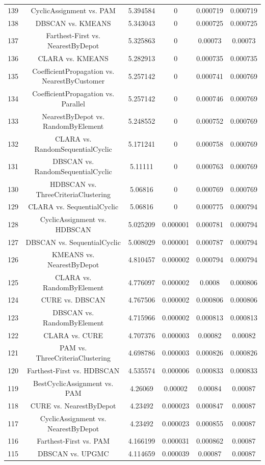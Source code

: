 \documentclass[a4paper,10pt]{article}
\begin{document}
\begin{landscape}
\begin{table}[!htp]
\begin{tabular}{cccccc}
139&CyclicAssignment vs. PAM&5.394584&0&0.000719&0.000719\\
138&DBSCAN vs. KMEANS&5.343043&0&0.000725&0.000725\\
137&Farthest-First vs. NearestByDepot&5.325863&0&0.00073&0.00073\\
136&CLARA vs. KMEANS&5.282913&0&0.000735&0.000735\\
135&CoefficientPropagation vs. NearestByCustomer&5.257142&0&0.000741&0.000769\\
134&CoefficientPropagation vs. Parallel&5.257142&0&0.000746&0.000769\\
133&NearestByDepot vs. RandomByElement&5.248552&0&0.000752&0.000769\\
132&CLARA vs. RandomSequentialCyclic&5.171241&0&0.000758&0.000769\\
131&DBSCAN vs. RandomSequentialCyclic&5.11111&0&0.000763&0.000769\\
130&HDBSCAN vs. ThreeCriteriaClustering&5.06816&0&0.000769&0.000769\\
129&CLARA vs. SequentialCyclic&5.06816&0&0.000775&0.000794\\
128&CyclicAssignment vs. HDBSCAN&5.025209&0.000001&0.000781&0.000794\\
127&DBSCAN vs. SequentialCyclic&5.008029&0.000001&0.000787&0.000794\\
126&KMEANS vs. NearestByDepot&4.810457&0.000002&0.000794&0.000794\\
125&CLARA vs. RandomByElement&4.776097&0.000002&0.0008&0.000806\\
124&CURE vs. DBSCAN&4.767506&0.000002&0.000806&0.000806\\
123&DBSCAN vs. RandomByElement&4.715966&0.000002&0.000813&0.000813\\
122&CLARA vs. CURE&4.707376&0.000003&0.00082&0.00082\\
121&PAM vs. ThreeCriteriaClustering&4.698786&0.000003&0.000826&0.000826\\
120&Farthest-First vs. HDBSCAN&4.535574&0.000006&0.000833&0.000833\\
119&BestCyclicAssignment vs. PAM&4.26069&0.00002&0.00084&0.00087\\
118&CURE vs. NearestByDepot&4.23492&0.000023&0.000847&0.00087\\
117&CyclicAssignment vs. NearestByDepot&4.23492&0.000023&0.000855&0.00087\\
116&Farthest-First vs. PAM&4.166199&0.000031&0.000862&0.00087\\
115&DBSCAN vs. UPGMC&4.114659&0.000039&0.00087&0.00087\\

\end{tabular}
\end{table}
\end{landscape}
\end{document}
